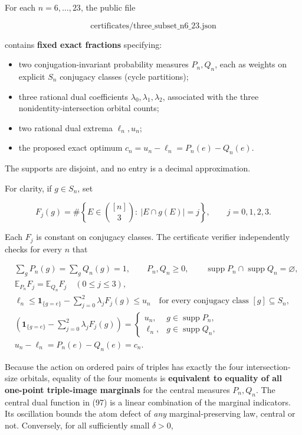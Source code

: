 \documentclass[
  11pt,
]{article}
\providecommand{\tightlist}{%
  \setlength{\itemsep}{0pt}\setlength{\parskip}{0pt}}
\begin{document}
For each \(n=6,\ldots,23\), the public file

\[
\text{certificates/three\_subset\_n6\_23.json} \tag{95}
\]

contains \textbf{fixed exact fractions} specifying:

\begin{itemize}
\tightlist
\item
  two conjugation-invariant probability measures \(P_n,Q_n\), each as
  weights on explicit \(S_n\) conjugacy classes (cycle partitions);
\item
  three rational dual coefficients \(\lambda_0,\lambda_1,\lambda_2\),
  associated with the three nonidentity-intersection orbital counts;
\item
  two rational dual extrema \(\ell_n,u_n\);
\item
  the proposed exact optimum \(c_n=u_n-\ell_n=P_n(e)-Q_n(e)\).
\end{itemize}

The supports are disjoint, and no entry is a decimal approximation.

For clarity, if \(g\in S_n\), set

\[
F_j(g)=\#\left\{E\in\binom{[n]}3:\ |E\cap g(E)|=j\right\},
\qquad j=0,1,2,3. \tag{96}
\]

Each \(F_j\) is constant on conjugacy classes. The certificate verifier
independently checks for every \(n\) that

\[
\begin{aligned}
&\sum_{g}P_n(g)=\sum_{g}Q_n(g)=1,\qquad P_n,Q_n\ge0,\qquad
\operatorname{supp}P_n\cap\operatorname{supp}Q_n=\varnothing,\\
&\mathbb E_{P_n}F_j=\mathbb E_{Q_n}F_j\quad(0\le j\le3),\\
&\ell_n\le
\mathbf1_{\{g=e\}}-\sum_{j=0}^{2}\lambda_jF_j(g)
\le u_n\quad\text{for every conjugacy class }[g]\subseteq S_n,\\
&\left(\mathbf1_{\{g=e\}}-\sum_{j=0}^{2}\lambda_jF_j(g)\right)
=\begin{cases}u_n,&g\in\operatorname{supp}P_n,\\
\ell_n,&g\in\operatorname{supp}Q_n,
\end{cases}\\
&u_n-\ell_n=P_n(e)-Q_n(e)=c_n.
\end{aligned}\tag{97}
\]

Because the action on ordered pairs of triples has exactly the four
intersection-size orbitals, equality of the four moments is
\textbf{equivalent to equality of all one-point triple-image marginals}
for the central measures \(P_n,Q_n\). The central dual function in (97)
is a linear combination of the marginal indicators. Its oscillation
bounds the atom defect of \emph{any} marginal-preserving law, central or
not. Conversely, for all sufficiently small \(\delta>0\),
\end{document}

